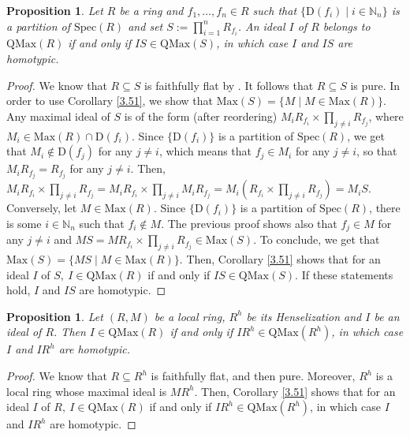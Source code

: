 \documentclass[12pt,leqno]{amsart}
\newtheorem{proposition}[theorem]{Proposition}
\theoremstyle{definition}
\begin{document}
\begin{proposition}\label{3.12} Let $R$ be a ring and $f_1,\ldots,f_n\in R$ such that $\{\mathrm{D}(f_i)\mid i\in\mathbb{N}_n\}$ is a partition of $\mathrm{Spec}(R)$ and set $S:=\prod_{i=1}^nR_{f_i}$. An ideal $I$ of $R$ belongs to $\mathrm{QMax}(R)$ if and only if $IS\in\mathrm{QMax}(S)$, in which case $I$ and $IS$ are homotypic. 
\end{proposition}
\begin{proof} We know that $R\subseteq S$ is faithfully flat by \cite[Proposition 3, p.137]{ALCO}. It follows that $R\subseteq S$ is pure. In order to use Corollary \ref{3.51}, we show that $\mathrm{Max}(S)=\{M\mid M\in\mathrm{Max}(R)\}$. Any maximal ideal of $S$ is of the form (after reordering) $M_iR_{f_i}\times\prod_{j\neq i}R_{f_j}$, where $M_i\in\mathrm {Max}(R)\cap\mathrm{D}(f_i)$. Since $\{\mathrm{D}(f_i)\}$ is a partition of $\mathrm{Spec}(R)$, we get that $M_i\not\in\mathrm{D}(f_j)$ for any $j\neq i$, which means that $f_j\in M_i$ for any $j\neq i$, so that $M_iR_{f_j}=R_{f_j}$ for any $j\neq i$. Then, $M_iR_{f_i}\times\prod_{j\neq i}R_{f_j}= M_iR_{f_i}\times\prod_{j\neq i}M_iR_{f_j}=M_i(R_{f_i}\times\prod_{j\neq i}R _{f_j})=M_iS$. Conversely, let $M\in\mathrm{Max}(R)$. Since $\{\mathrm {D}(f_i)\}$ is a partition of $\mathrm{Spec}(R)$, there is some $i\in\mathbb {N}_n$ such that $f_i\not\in M$. The previous proof shows also that $f_j\in M$ for any $j\neq i$ and $MS=MR_{f_i}\times\prod_{j\neq i}R_{f_j}\in\mathrm{Max}(S)$. To conclude, we get that $\mathrm{Max}(S)=\{MS\mid M\in\mathrm{Max}(R)\}$. Then, Corollary \ref{3.51} shows that for an ideal $I$ of $S,\ I\in\mathrm{QMax}(R)$ if and only if $IS\in\mathrm{QMax}(S)$. If these statements hold, $I$ and $IS$ are homotypic. 
\end{proof} 

\begin{proposition} \label{3.13} Let $(R,M)$ be a local ring, $R^h$ be its Henselization and $I$ be an ideal of $R$. Then $I\in\mathrm{QMax}(R)$ if and only if $IR^h\in\mathrm{QMax}(R^h)$, in which case $I$ and $IR^h$ 
are homotypic. 
\end{proposition}
\begin{proof} We know that $R\subseteq R^h$ is faithfully flat, and then pure. Moreover, $R^h$ is a local ring whose maximal ideal is $MR^h$. Then, Corollary \ref{3.51} shows that for an ideal $I$ of $R,\ I\in\mathrm {QMax}(R)$ if and only if $IR^h\in\mathrm{QMax}(R^h)$, in which case $I$ and $I R^h$ are homotypic. 
\end{proof}
\end{document}
